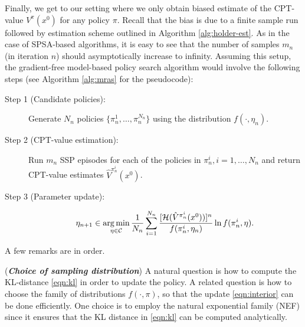 \documentclass[11pt,letterpaper,english]{article}
\begin{document}
                    
Finally, we get to our setting where we only obtain biased estimate of the CPT-value $V^\pi(x^0)$ for any policy $\pi$. Recall that the bias is due to a finite sample run followed by estimation scheme outlined in Algorithm \ref{alg:holder-est}. As in the case of SPSA-based algorithms, it is easy to see that the number of samples $m_n$ (in iteration $n$) should asymptotically increase to infinity. Assuming this setup, the gradient-free model-based policy search algorithm would involve the following steps (see Algorithm \ref{alg:mras} for the pseudocode):

\begin{description}
 \item[Step 1 (Candidate policies):] Generate $N_n$ policies $\{\pi^1_n, \ldots, \pi^{N_n}_n\}$ using the distribution $f(\cdot,\eta_n)$.

\item[Step 2 (CPT-value estimation):] Run $m_n$ SSP episodes for each of the policies in $\pi^i_n, i=1,\ldots, N_n$ and return CPT-value estimates $\hat V^{\pi^i_n}(x^0)$.

\item[Step 3 (Parameter update):]
                         \begin{equation} \label{eqn:step4}
                           \eta_{n+1} \in \mathop{\rm arg\,min}_{\eta \in \mathcal{C}}\frac{1}{N_n}\sum_{i=1}^{N_n}\frac{[\mathcal{H}(\hat V^{\pi^i_n}(x^0))]^n}{ f(\pi_n^i,\eta_n)}\ln f(\pi_n^i,\eta).
                            \end{equation}

\end{description}

                    
A few remarks are in order.
\begin{remark}(\textbf{\textit{Choice of sampling distribution}})
A natural question is how to compute the KL-distance \eqref{eqn:kl} in order to update the policy. A related question is how to choose the family of distributions $f(\cdot,\pi)$, so that the update \eqref{eqn:interior} can be done efficiently. One choice is to employ the natural exponential family (NEF) since it ensures that the KL distance in \eqref{eqn:kl} can be computed analytically. %
\end{remark}
\end{document}
